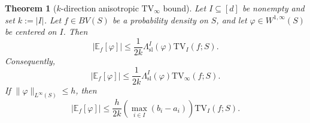 \documentclass[11pt,letterpaper]{article}
\newtheorem{theorem}{Theorem}[section]
\theoremstyle{definition}
\theoremstyle{remark}
\newcommand{\TV}{\mathrm{TV}}
\begin{document}
\begin{theorem}[$k$-direction anisotropic $\TV_\infty$ bound]
\label{thm:k_direction_tv_bound}
Let $I\subseteq[d]$ be nonempty and set $k:=|I|$. Let $f\in BV(S)$ be a
probability density on $S$, and let $\varphi\in W^{1,\infty}(S)$ be centered on
$I$. Then
\begin{equation}
\label{eq:k_direction_tv_bound}
|\mathbb E_f[\varphi]|
\le
\frac{1}{2k}
\Lambda_{\mathrm{sl}}^I(\varphi)
\TV_I(f;S).
\end{equation}
Consequently,
\begin{equation}
\label{eq:k_direction_tv_bound_tvinfty}
|\mathbb E_f[\varphi]|
\le
\frac{1}{2k}
\Lambda_{\mathrm{sl}}^I(\varphi)
\TV_\infty(f;S).
\end{equation}
If $\|\varphi\|_{L^\infty(S)}\le h$, then
\begin{equation}
\label{eq:k_direction_tv_bound_sup}
|\mathbb E_f[\varphi]|
\le
\frac{h}{2k}
\left(\max_{i\in I}(b_i-a_i)\right)
\TV_I(f;S).
\end{equation}
\end{theorem}
\end{document}
